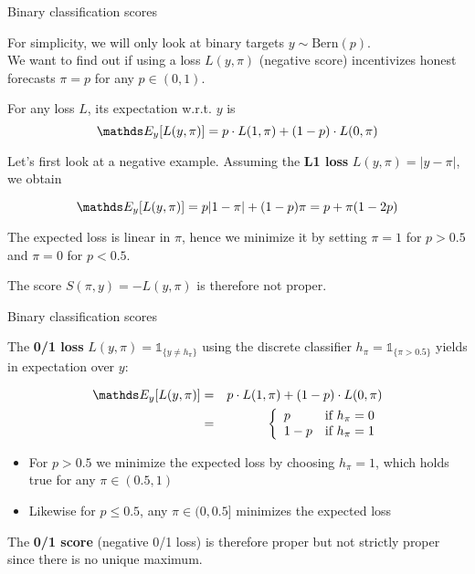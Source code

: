 \documentclass[11pt,compress,t,notes=noshow, xcolor=table]{beamer}
\begin{document}
\begin{vbframe}{Binary classification scores}

For simplicity, we will only look at binary targets $y \sim \text{Bern}(p)$.\\ %
We want to find out if using a loss $L(y, \pi)$ (negative score) incentivizes honest forecasts $\pi=p$ for any $p \in (0,1)$.

\lz

For any loss $L$, its expectation w.r.t. $y$ is
$$\E_{y}[L(y, \pi)]=p \cdot L(1, \pi) + (1-p) \cdot L(0, \pi)$$

\vspace{0.2cm}

Let's first look at a negative example. Assuming the \textbf{L1 loss} $L(y,\pi)=|y-\pi|$, we obtain

$$\E_y[L(y, \pi)]=p |1-\pi| + (1-p) \pi = p+\pi(1-2p)$$

\vspace{0.2cm}

The expected loss is linear in $\pi$, hence we minimize it by setting $\pi = 1$ for $p>0.5$ and $\pi = 0$ for $p<0.5$. 

\vspace{0.2cm}

The score $S(\pi,y)=-L(y,\pi)$ is therefore not proper.

\end{vbframe}

\begin{vbframe}{Binary classification scores}

The \textbf{0/1 loss} $L(y,\pi)=\mathds{1}_{\{y \neq h_\pi\}}$ using the discrete classifier $h_{\pi}=\mathds{1}_{\{\pi>0.5\}}$ yields in expectation over $y$:

\begin{eqnarray*}
\E_y[L(y, \pi)] &=& p \cdot L(1,\pi) + (1-p) \cdot L(0,\pi)\\
&=& \left\{
\begin{array}{ll}
p & \text{if } h_{\pi} = 0 \\
1-p & \text{if } h_{\pi} = 1
\end{array}
\right.
\end{eqnarray*}

\begin{itemize}
    \item For $p>0.5$ we minimize the expected loss by choosing $h_{\pi}=1$, which holds true for any $\pi \in (0.5,1)$
    \item Likewise for $p\leq 0.5$, any $\pi \in (0, 0.5]$ minimizes the expected loss
\end{itemize}

\lz

The \textbf{0/1 score} (negative 0/1 loss) is therefore proper but not strictly proper since there is no unique maximum.

\end{vbframe}
\end{document}
